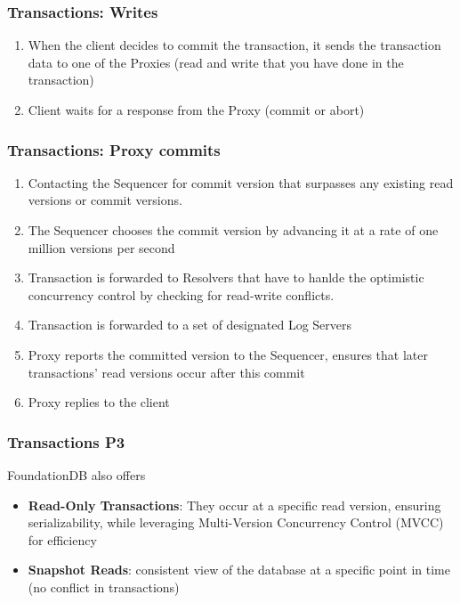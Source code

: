 \begin{frame}
	\frametitle{Transactions: Writes}
\begin{enumerate}
    \item When the client decides to commit the transaction, it sends the transaction data to one of the Proxies (read and write that you have done in the transaction)
    \item Client waits for a response from the Proxy (commit or abort)

\end{enumerate}

\end{frame}




\begin{frame}
	\frametitle{Transactions: Proxy commits}
\begin{enumerate}
    \item Contacting the Sequencer for commit version that surpasses any existing read versions or commit versions.
    \item The Sequencer chooses the commit version by advancing it at a rate of one million versions per second
    \item Transaction is forwarded to Resolvers that have to hanlde the optimistic concurrency control by checking for read-write conflicts.
    \item Transaction is forwarded to a set of designated Log Servers
    \item Proxy reports the committed version to the Sequencer, ensures that later transactions' read versions occur after this commit
    \item Proxy replies to the client
\end{enumerate}
\end{frame}


\begin{frame}
	\frametitle{Transactions P3}

 FoundationDB also offers
 
 \begin{itemize}
     \item \textbf{Read-Only Transactions}: They occur at a specific read version, ensuring serializability, while leveraging Multi-Version Concurrency Control (MVCC) for efficiency
     \item \textbf{Snapshot Reads}: consistent view of the database at a specific point in time (no conflict in transactions)
 \end{itemize}

\end{frame}


